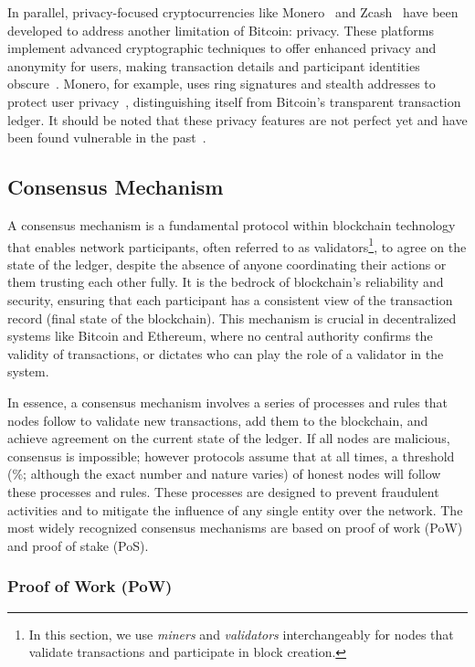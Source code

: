 In parallel, privacy-focused cryptocurrencies like Monero~\cite{monero} and Zcash~\cite{hopwood2016zcash} have been developed to address another limitation of Bitcoin: privacy. These platforms implement advanced cryptographic techniques to offer enhanced privacy and anonymity for users, making transaction details and participant identities obscure~\cite{van2013cryptonote, miers2013zerocoin}. Monero, for example, uses ring signatures and stealth addresses to protect user privacy~\cite{cryptoeprint2015}, distinguishing itself from Bitcoin's transparent transaction ledger. It should be noted that these privacy features are not perfect yet and have been found vulnerable in the past~\cite{kumar2017traceability,MMLN17}.



\subsection{Consensus Mechanism}\label{consensus_mechanism}
A consensus mechanism is a fundamental protocol within blockchain technology that enables network participants, often referred to as validators\footnote{In this section, we use \textit{miners} and \textit{validators} interchangeably for nodes that validate transactions and participate in block creation.}, to agree on the state of the ledger, despite the absence of anyone coordinating their actions or them trusting each other fully. It is the bedrock of blockchain's reliability and security, ensuring that each participant has a consistent view of the transaction record (final state of the blockchain). This mechanism is crucial in decentralized systems like Bitcoin and Ethereum, where no central authority confirms the validity of transactions, or dictates who can play the role of a validator in the system. 

In essence, a consensus mechanism involves a series of processes and rules that nodes follow to validate new transactions, add them to the blockchain, and achieve agreement on the current state of the ledger. If all nodes are malicious, consensus is impossible; however protocols assume that at all times, a threshold (\%; although the exact number and nature varies) of honest nodes will follow these processes and rules. These processes are designed to prevent fraudulent activities and to mitigate the influence of any single entity over the network. The most widely recognized consensus mechanisms are based on proof of work (PoW) and proof of stake (PoS).

\subsubsection{Proof of Work (PoW)} \label{pow}

